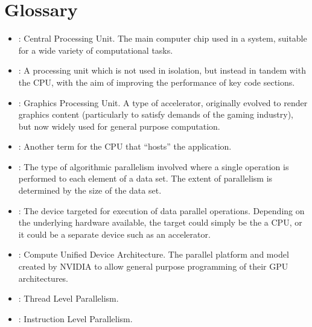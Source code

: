 \section*{Glossary}

\begin{itemize}

    \item {}: Central Processing Unit. The main computer chip used in a system, suitable for a wide variety of computational tasks.
    \item {}: A processing unit which is not used in isolation, but instead in tandem with the CPU, with the aim of improving the performance of key code sections. 
    \item {}: Graphics Processing Unit. A type of accelerator, originally evolved to render graphics content (particularly to satisfy demands of the gaming industry), but now widely used for general purpose computation.
    \item {}: Another term for the CPU that ``hosts'' the application.
    \item {}: The type of algorithmic parallelism involved where a single operation is performed to each element of a data set. The extent of parallelism is determined by the size of the data set.
    \item {}: The device targeted for execution of data parallel operations.  Depending on the underlying hardware available, the target could simply be the a CPU, or it could be a separate device such as an accelerator.
    \item {}: Compute Unified Device Architecture. The parallel platform and model created by NVIDIA to allow general purpose programming of their GPU architectures.
    \item {}: Thread Level Parallelism.
    \item {}: Instruction Level Parallelism.
      
\end{itemize}




